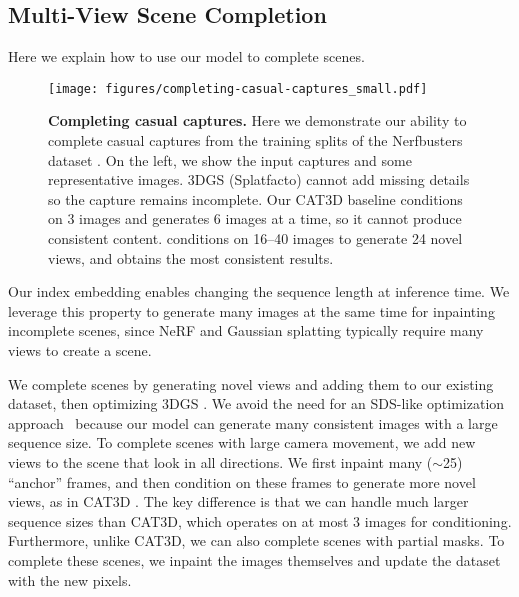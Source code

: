 \subsection{Multi-View Scene Completion}\label{sec:multi-view-completion}

Here we explain how to use our model to complete scenes.

\begin{figure*}[t]
\centering
\texttt{[image: figures/completing-casual-captures\_small.pdf]}\vspace{-0.5em}
\caption{\label{fig:completing_casual_captures}%
    \textbf{Completing casual captures.}
    Here we demonstrate our ability to complete casual captures from the training splits of the Nerfbusters dataset \cite{warburg2023nerfbusters}.
    On the left, we show the input captures and some representative images.
    3DGS (Splatfacto) cannot add missing details so the capture remains incomplete.
    Our CAT3D baseline conditions on 3 images and generates 6 images at a time, so it cannot produce consistent content.
    \method conditions on 16–40 images to generate 24 novel views, and obtains the most consistent results.
}\vspace{-1em}
\end{figure*}

%
Our index embedding enables changing the sequence length at inference time.
We leverage this property to generate many images at the same time for inpainting incomplete scenes, since NeRF and Gaussian splatting typically require many views to create a scene.


%
We complete scenes by generating novel views and adding them to our existing dataset, then optimizing 3DGS \cite{kerbl20233d}.
We avoid the need for an SDS-like optimization approach~\cite{poole2022dreamfusion,haque2023instruct} because our model can generate many consistent images with a large sequence size.
To complete scenes with large camera movement, we add new views to the scene that look in all directions.
We first inpaint many ($\sim$25) ``anchor'' frames, and then condition on these frames to generate more novel views, as in CAT3D \cite{gao2024cat3d}.
The key difference is that we can handle much larger sequence sizes than CAT3D, which operates on at most 3 images for conditioning.
Furthermore, unlike CAT3D, we can also complete scenes with partial masks.
To complete these scenes, we inpaint the images themselves and update the dataset with the new pixels.

